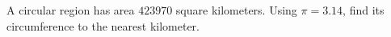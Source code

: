 A circular region has area $423970$ square kilometers. Using $\pi=3.14$, find its circumference to the nearest kilometer.
